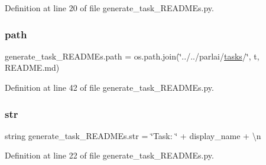 Definition at line 20 of file generate\+\_\+task\+\_\+\+R\+E\+A\+D\+M\+Es.\+py.

\mbox{\label{namespacegenerate__task__READMEs_ae2eccad91867a8cb484ed9d5d92187e1}} 
\subsubsection{\texorpdfstring{path}{path}}
{\footnotesize\ttfamily generate\+\_\+task\+\_\+\+R\+E\+A\+D\+M\+Es.\+path = os.\+path.\+join(\char`\"{}../../parlai/\hyperlink{namespacegenerate__task__READMEs_a8f4da8ba04584af52e0e9e2f209245c2}{tasks}/\char`\"{}, t, \textquotesingle{}R\+E\+A\+D\+M\+E.\+md\textquotesingle{})}



Definition at line 42 of file generate\+\_\+task\+\_\+\+R\+E\+A\+D\+M\+Es.\+py.

\mbox{\label{namespacegenerate__task__READMEs_a5b88452ffb87b78c8c85ececebafc09f}} 
\subsubsection{\texorpdfstring{str}{str}}
{\footnotesize\ttfamily string generate\+\_\+task\+\_\+\+R\+E\+A\+D\+M\+Es.\+str = \char`\"{}Task\+: \char`\"{} + display\+\_\+name + \textquotesingle{}\textbackslash{}n\textquotesingle{}}



Definition at line 22 of file generate\+\_\+task\+\_\+\+R\+E\+A\+D\+M\+Es.\+py.



